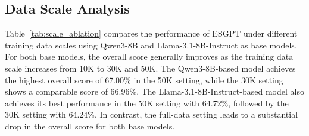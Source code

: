 \documentclass[11pt]{article}
\begin{document}



\subsection{Data Scale Analysis}
\label{app:scale_ablation}
Table~\ref{tab:scale_ablation} compares the performance of \textsf{ESGPT} under different training data scales using Qwen3-8B and Llama-3.1-8B-Instruct as base models. For both base models, the overall score generally improves as the training data scale increases from 10K to 30K and 50K. The Qwen3-8B-based model achieves the highest overall score of 67.00\% in the 50K setting, while the 30K setting shows a comparable score of 66.96\%. The Llama-3.1-8B-Instruct-based model also achieves its best performance in the 50K setting with 64.72\%, followed by the 30K setting with 64.24\%. In contrast, the full-data setting leads to a substantial drop in the overall score for both base models.
\end{document}
